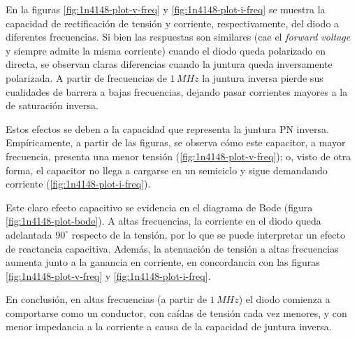 \documentclass[../main.tex]{subfiles}
\begin{document}
En la figuras \ref{fig:1n4148-plot-v-freq} y \ref{fig:1n4148-plot-i-freq} se muestra la capacidad de rectificación de tensión y corriente, respectivamente, del diodo a diferentes frecuencias. Si bien las respuestas son similares (cae el \emph{forward voltage} y siempre admite la misma corriente) cuando el diodo queda polarizado en directa, se observan claras diferencias cuando la juntura queda inversamente polarizada. A partir de frecuencias de $1\,MHz$ la juntura inversa pierde sus cualidades de barrera a bajas frecuencias, dejando pasar corrientes mayores a la de saturación inversa. 

Estos efectos se deben a la capacidad que representa la juntura PN inversa. Empíricamente, a partir de las figuras, se observa cómo este capacitor, a mayor frecuencia, presenta una menor tensión (\ref{fig:1n4148-plot-v-freq}); o, visto de otra forma, el capacitor no llega a cargarse en un semiciclo y sigue demandando corriente (\eqref{fig:1n4148-plot-i-freq}).



Este claro efecto capacitivo se evidencia en el diagrama de Bode (figura \ref{fig:1n4148-plot-bode}). A altas frecuencias, la corriente en el diodo queda adelantada $90^\circ$ respecto de la tensión, por lo que se puede interpretar un efecto de reactancia capacitiva. Además, la atenuación de tensión a altas frecuencias aumenta junto a la ganancia en corriente, en concordancia con las figuras \ref{fig:1n4148-plot-v-freq} y \ref{fig:1n4148-plot-i-freq}.



En conclusión, en altas frecuencias (a partir de $1\,MHz$) el diodo comienza a comportarse como un conductor, con caídas de tensión cada vez menores, y con menor impedancia a la corriente a causa de la capacidad de juntura inversa.
\end{document}
